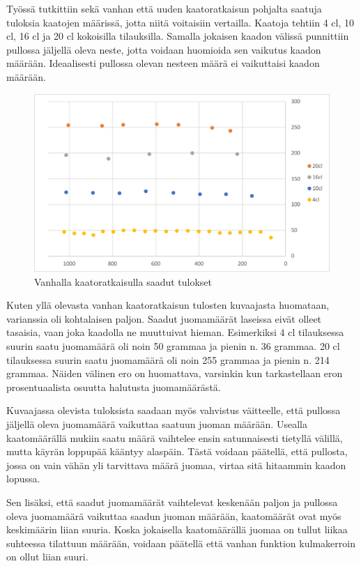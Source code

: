 Työssä tutkittiin sekä vanhan että uuden kaatoratkaisun pohjalta saatuja tuloksia kaatojen määrissä, jotta niitä voitaisiin vertailla. Kaatoja tehtiin 4 cl, 10 cl, 16 cl ja 20 cl kokoisilla tilauksilla. Samalla jokaisen kaadon välissä punnittiin pullossa jäljellä oleva neste, jotta voidaan huomioida sen vaikutus kaadon määrään. Ideaalisesti pullossa olevan nesteen määrä ei vaikuttaisi kaadon määrään.

\begin{figure}[h]
\begin{center}
\includegraphics[scale=0.25]{img/kaadot_vanha.pdf}
\end{center}
\caption{Vanhalla kaatoratkaisulla saadut tulokset}
\label{fig:kaadot_vanha}
\end{figure}

Kuten yllä olevasta vanhan kaatoratkaisun tulosten kuvaajasta huomataan, varianssia oli kohtalaisen paljon. Saadut juomamäärät laseissa eivät olleet tasaisia, vaan joka kaadolla ne muuttuivat hieman. Esimerkiksi 4 cl tilauksessa suurin saatu juomamäärä oli noin 50 grammaa ja pienin n. 36 grammaa. 20 cl tilauksessa suurin saatu juomamäärä oli noin 255 grammaa ja pienin n. 214 grammaa. Näiden välinen ero on huomattava, varsinkin kun tarkastellaan eron prosentuaalista osuutta halutusta juomamäärästä.

Kuvaajassa olevista tuloksista saadaan myös vahvistus väitteelle, että pullossa jäljellä oleva juomamäärä vaikuttaa saatuun juoman määrään. Usealla kaatomäärällä mukiin saatu määrä vaihtelee ensin satunnaisesti tietyllä välillä, mutta käyrän loppupää kääntyy alaspäin. Tästä voidaan päätellä, että pullosta, jossa on vain vähän yli tarvittava määrä juomaa, virtaa sitä hitaammin kaadon lopussa.

Sen lisäksi, että saadut juomamäärät vaihtelevat keskenään paljon ja pullossa oleva juomamäärä vaikuttaa saadun juoman määrään, kaatomäärät ovat myös keskimäärin liian suuria. Koska jokaisella kaatomäärällä juomaa on tullut liikaa suhteessa tilattuun määrään, voidaan päätellä että vanhan funktion kulmakerroin on ollut liian suuri.

